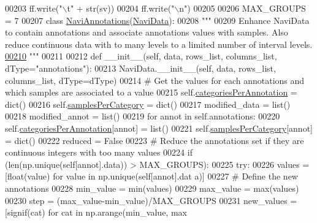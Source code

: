 \begin{DoxyCode}
00203                     ff.write(\textcolor{stringliteral}{"\(\backslash\)t"} + str(sv))
00204                 ff.write(\textcolor{stringliteral}{"\(\backslash\)n"})
00205             
00206 MAX\_GROUPS = 7
00207 \textcolor{keyword}{class }\hyperlink{classnavicom_1_1navidata_1_1NaviAnnotations}{NaviAnnotations}(\hyperlink{classnavicom_1_1navidata_1_1NaviData}{NaviData}):
00208     \textcolor{stringliteral}{"""}
00209 \textcolor{stringliteral}{    Enhance NaviData to contain annotations and associate annotations values with
       samples. Also reduce continuous data with to many levels to a limited number of 
      interval levels.}
\hypertarget{navidata_8py_source_l00210}{}\hyperlink{classnavicom_1_1navidata_1_1NaviAnnotations}{00210} \textcolor{stringliteral}{    """}
00211 
00212     \textcolor{keyword}{def }\_\_init\_\_(self, data, rows\_list, columns\_list, dType="annotations"):
00213         NaviData.\_\_init\_\_(self, data, rows\_list, columns\_list, dType=dType)
00214         \textcolor{comment}{# Get the values for each annotations and which samples are associated to
       a value}
00215         self.\hyperlink{classnavicom_1_1navidata_1_1NaviAnnotations_a1c26e115cb2eabe4384cd2fa0c7f776f}{categoriesPerAnnotation} = dict()
00216         self.\hyperlink{classnavicom_1_1navidata_1_1NaviAnnotations_a7cbb4ab623948f19e055f5b4b7c938a9}{samplesPerCategory} = dict()
00217         modified\_data = list()
00218         modified\_annot = list()
00219         \textcolor{keywordflow}{for} annot \textcolor{keywordflow}{in} self.annotations:
00220             self.\hyperlink{classnavicom_1_1navidata_1_1NaviAnnotations_a1c26e115cb2eabe4384cd2fa0c7f776f}{categoriesPerAnnotation}[annot] = list()
00221             self.\hyperlink{classnavicom_1_1navidata_1_1NaviAnnotations_a7cbb4ab623948f19e055f5b4b7c938a9}{samplesPerCategory}[annot] = dict()
00222             reduced = \textcolor{keyword}{False}
00223             \textcolor{comment}{# Reduce the annotations set if they are continuous integers with too
       many values}
00224             \textcolor{keywordflow}{if} (len(np.unique(self[annot].data)) > MAX\_GROUPS):
00225                 \textcolor{keywordflow}{try}:
00226                     values = [float(value) \textcolor{keywordflow}{for} value \textcolor{keywordflow}{in} np.unique(self[annot].dat
      a)]
00227                     \textcolor{comment}{# Define the new annotations}
00228                     min\_value = min(values)
00229                     max\_value = max(values)
00230                     step = (max\_value-min\_value)/MAX\_GROUPS
00231                     new\_values = [signif(cat) \textcolor{keywordflow}{for} cat \textcolor{keywordflow}{in} np.arange(min\_value, max

\end{DoxyCode}
